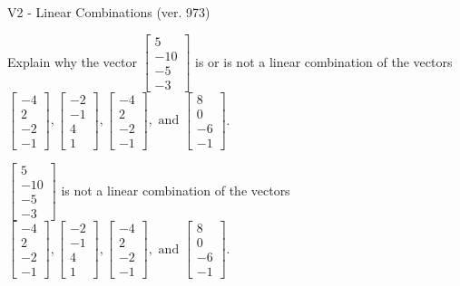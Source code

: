 \begin{exercise}
  \begin{exerciseTitle}V2 - Linear Combinations (ver. 973)\end{exerciseTitle}
  \begin{exerciseStatement}
    Explain why the vector \(\left[\begin{array}{c}
5 \\
-10 \\
-5 \\
-3
\end{array}\right]\)  is or is not a linear 
	combination of the vectors \(\left[\begin{array}{c}
-4 \\
2 \\
-2 \\
-1
\end{array}\right] , \left[\begin{array}{c}
-2 \\
-1 \\
4 \\
1
\end{array}\right] , \left[\begin{array}{c}
-4 \\
2 \\
-2 \\
-1
\end{array}\right] , \text{ and } \left[\begin{array}{c}
8 \\
0 \\
-6 \\
-1
\end{array}\right]\).
	


  \end{exerciseStatement}
  \begin{exerciseAnswer}
   \(\left[\begin{array}{c}
5 \\
-10 \\
-5 \\
-3
\end{array}\right]\) 
  	 is not  
	a linear combination of the vectors \(\left[\begin{array}{c}
-4 \\
2 \\
-2 \\
-1
\end{array}\right] , \left[\begin{array}{c}
-2 \\
-1 \\
4 \\
1
\end{array}\right] , \left[\begin{array}{c}
-4 \\
2 \\
-2 \\
-1
\end{array}\right] , \text{ and } \left[\begin{array}{c}
8 \\
0 \\
-6 \\
-1
\end{array}\right]\).


\end{exerciseAnswer}
\end{exercise}
